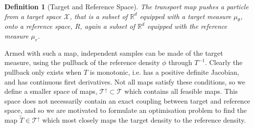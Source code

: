 \documentclass[final]{siamltex}
\newtheorem{dfn}{Definition}[section]
\begin{document}

\begin{dfn}[Target and Reference Space]
	The transport map pushes a particle from a {\it target space} $\mathcal{X}$, that is a subset of $\mathbb{R}^d$ equipped with a target measure $\mu_{\theta}$, onto a {\it reference space}, $R$, again a subset of $\mathbb{R}^d$ equipped with the reference measure $\mu_r$.
\end{dfn}

Armed with such a map, independent samples can be made of the target
measure, using the pullback of the reference density $\phi$ through $T^{-1}$.
Clearly the pullback only exists when $T$ is monotonic, i.e. has a positive definite Jacobian, and has continuous first derivatives.
Not all maps satisfy these conditions, so we define a smaller space of
maps, $\mathcal{T}^\uparrow \subset \mathcal{T}$ which contains all
feasible maps. This space does not necessarily contain an exact
coupling between target and reference space, and so we are motivated to formulate an optimisation problem to find the map $\tilde{T}
\in \mathcal{T}^\uparrow$ which most closely maps the target density
to the reference density.

\end{document}
